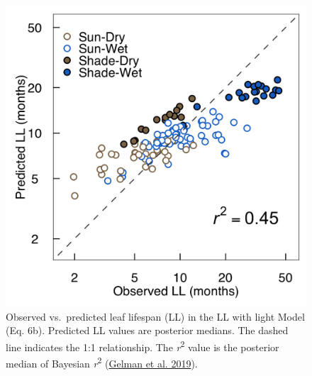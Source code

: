 \documentclass[
  12pt,
]{article}
\providecommand{\DIFaddbeginFL}{} %
\providecommand{\DIFaddendFL}{} %
\providecommand{\DIFdelbeginFL}{} %
\providecommand{\DIFdelendFL}{} %
\newcommand{\DIFscaledelfig}{0.5}
\newlength{\DIFdelgraphicswidth} %
\newlength{\DIFdelgraphicsheight} %
\newcommand{\DIFaddincludegraphics}[2][]{{\color{blue}\fbox{\DIFOincludegraphics[#1]{#2}}}} %
\newcommand{\DIFdelincludegraphics}[2][]{%
\sbox{\DIFdelgraphicsbox}{\DIFOincludegraphics[#1]{#2}}%
\settoboxwidth{\DIFdelgraphicswidth}{\DIFdelgraphicsbox} %
\settoboxtotalheight{\DIFdelgraphicsheight}{\DIFdelgraphicsbox} %
\scalebox{\DIFscaledelfig}{%
\parbox[b]{\DIFdelgraphicswidth}{\usebox{\DIFdelgraphicsbox}\\[-\baselineskip] \rule{\DIFdelgraphicswidth}{0em}}\llap{\resizebox{\DIFdelgraphicswidth}{\DIFdelgraphicsheight}{%
\setlength{\unitlength}{\DIFdelgraphicswidth}%
\begin{picture}(1,1)%
\thicklines\linethickness{2pt} %
{\color[rgb]{1,0,0}\put(0,0){\framebox(1,1){}}}%
{\color[rgb]{1,0,0}\put(0,0){\line( 1,1){1}}}%
{\color[rgb]{1,0,0}\put(0,1){\line(1,-1){1}}}%
\end{picture}%
}\hspace*{3pt}}} %
} %
\DeclareRobustCommand{\DIFaddbeginFL}{\DIFOaddbeginFL \let\includegraphics\DIFaddincludegraphics} %
\DeclareRobustCommand{\DIFaddendFL}{\DIFOaddendFL \let\includegraphics\DIFOincludegraphics} %
\DeclareRobustCommand{\DIFdelbeginFL}{\DIFOdelbeginFL \let\includegraphics\DIFdelincludegraphics} %
\DeclareRobustCommand{\DIFdelendFL}{\DIFOaddendFL \let\includegraphics\DIFOincludegraphics} %
\begin{document}
\begin{figure}
\DIFdelbeginFL %
\DIFdelendFL \DIFaddbeginFL \hypertarget{fig:LLplt}{%
\centering
\includegraphics{../figs/LL_plot2.png}
\caption{Observed vs.~predicted leaf lifespan (LL) in the LL with light Model (Eq. 6b).
Predicted LL values are posterior medians.
The dashed line indicates the 1:1 relationship.
The \emph{r}\textsuperscript{2} value is the posterior median of Bayesian \emph{r}\textsuperscript{2} (\protect\hyperlink{ref-Gelman2019}{Gelman et al. 2019}).}\label{fig:LLplt}
}
\DIFaddendFL \end{figure}

\newpage
\end{document}

